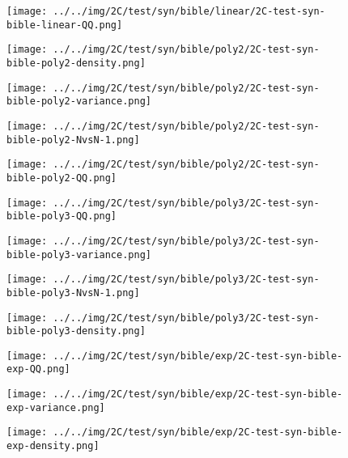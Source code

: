 \begin{figure}[H]
\centering	\texttt{[image: ../../img/2C/test/syn/bible/linear/2C-test-syn-bible-linear-QQ.png]}
\end{figure}
\begin{figure}[H]
\centering	\texttt{[image: ../../img/2C/test/syn/bible/poly2/2C-test-syn-bible-poly2-density.png]}
\end{figure}
\begin{figure}[H]
\centering	\texttt{[image: ../../img/2C/test/syn/bible/poly2/2C-test-syn-bible-poly2-variance.png]}
\end{figure}
\begin{figure}[H]
\centering	\texttt{[image: ../../img/2C/test/syn/bible/poly2/2C-test-syn-bible-poly2-NvsN-1.png]}
\end{figure}
\begin{figure}[H]
\centering	\texttt{[image: ../../img/2C/test/syn/bible/poly2/2C-test-syn-bible-poly2-QQ.png]}
\end{figure}
\begin{figure}[H]
\centering	\texttt{[image: ../../img/2C/test/syn/bible/poly3/2C-test-syn-bible-poly3-QQ.png]}
\end{figure}
\begin{figure}[H]
\centering	\texttt{[image: ../../img/2C/test/syn/bible/poly3/2C-test-syn-bible-poly3-variance.png]}
\end{figure}
\begin{figure}[H]
\centering	\texttt{[image: ../../img/2C/test/syn/bible/poly3/2C-test-syn-bible-poly3-NvsN-1.png]}
\end{figure}
\begin{figure}[H]
\centering	\texttt{[image: ../../img/2C/test/syn/bible/poly3/2C-test-syn-bible-poly3-density.png]}
\end{figure}
\begin{figure}[H]
\centering	\texttt{[image: ../../img/2C/test/syn/bible/exp/2C-test-syn-bible-exp-QQ.png]}
\end{figure}
\begin{figure}[H]
\centering	\texttt{[image: ../../img/2C/test/syn/bible/exp/2C-test-syn-bible-exp-variance.png]}
\end{figure}
\begin{figure}[H]
\centering	\texttt{[image: ../../img/2C/test/syn/bible/exp/2C-test-syn-bible-exp-density.png]}
\end{figure}
